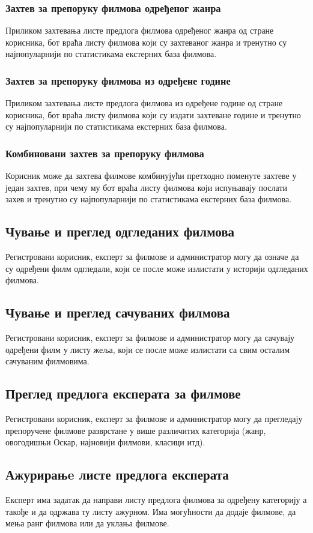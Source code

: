 \subsubsection{Захтев за препоруку филмова одређеног жанра}

Приликом захтевања листе предлога филмова одређеног жанра од стране корисника, бот враћа листу филмова који
су захтеваног жанра и тренутно су најпопуларнији по статистикама екстерних база филмова.

\subsubsection{Захтев за препоруку филмова из одређене године}

Приликом захтевања листе предлога филмова из одређене године од стране корисника, бот враћа листу филмова који
су издати захтеване године и тренутно су најпопуларнији по статистикама екстерних база филмова.

\subsubsection{Комбиновани захтев за препоруку филмова}

Корисник може да захтева филмове комбинујући претходно поменуте захтеве у један захтев, при чему му бот враћа
листу филмова који испуњавају послати захев и тренутно су најпопуларнији по статистикама екстерних база филмова.

\subsection{Чување и преглед одгледаних филмова}

Регистровани корисник, експерт за филмове и администратор могу да означе да су одређени филм одгледали, који се
после може излистати у историји одгледаних филмова.

\subsection{Чување и преглед сачуваних филмова}

Регистровани корисник, експерт за филмове и администратор могу да сачувају одређени филм у листу жеља, који се
после може излистати са свим осталим сачуваним филмовима.

\subsection{Преглед предлога експерата за филмове}

Регистровани корисник, експерт за филмове и администратор могу да прегледају препоручене филмове разврстане у
више различитих категорија (жанр, овогодишњи Оскар, најновији филмови, класици итд).

\subsection{Ажурирањe листе предлога експерата }

Експерт има задатак да направи листу предлога филмова за одређену категорију а такође и да одржава ту листу ажурном. Има могућности да додаје филмове, да мења ранг филмова или да уклања филмове.
